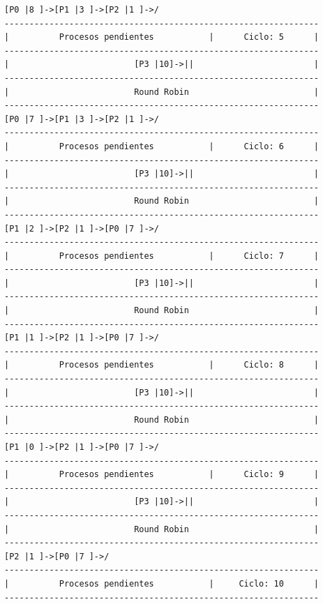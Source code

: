 \documentclass[12pt]{article}
\begin{document}
\begin{verbatim}
[P0 |8 ]->[P1 |3 ]->[P2 |1 ]->/
---------------------------------------------------------------
|          Procesos pendientes           |      Ciclo: 5      |
---------------------------------------------------------------
|                         [P3 |10]->||                        |
---------------------------------------------------------------
|                         Round Robin                         |
---------------------------------------------------------------
[P0 |7 ]->[P1 |3 ]->[P2 |1 ]->/
---------------------------------------------------------------
|          Procesos pendientes           |      Ciclo: 6      |
---------------------------------------------------------------
|                         [P3 |10]->||                        |
---------------------------------------------------------------
|                         Round Robin                         |
---------------------------------------------------------------
[P1 |2 ]->[P2 |1 ]->[P0 |7 ]->/
---------------------------------------------------------------
|          Procesos pendientes           |      Ciclo: 7      |
---------------------------------------------------------------
|                         [P3 |10]->||                        |
---------------------------------------------------------------
|                         Round Robin                         |
---------------------------------------------------------------
[P1 |1 ]->[P2 |1 ]->[P0 |7 ]->/
---------------------------------------------------------------
|          Procesos pendientes           |      Ciclo: 8      |
---------------------------------------------------------------
|                         [P3 |10]->||                        |
---------------------------------------------------------------
|                         Round Robin                         |
---------------------------------------------------------------
[P1 |0 ]->[P2 |1 ]->[P0 |7 ]->/
---------------------------------------------------------------
|          Procesos pendientes           |      Ciclo: 9      |
---------------------------------------------------------------
|                         [P3 |10]->||                        |
---------------------------------------------------------------
|                         Round Robin                         |
---------------------------------------------------------------
[P2 |1 ]->[P0 |7 ]->/
---------------------------------------------------------------
|          Procesos pendientes           |     Ciclo: 10      |
---------------------------------------------------------------

\end{verbatim}
\end{document}
